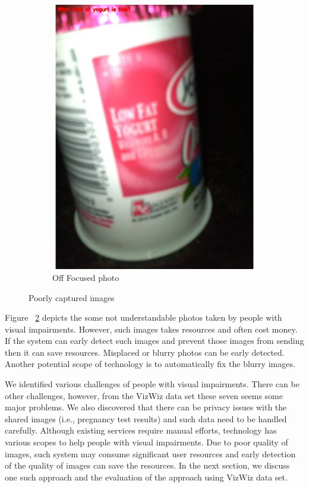 \documentclass[sigconf]{acmart}
\begin{document}
\begin{figure}[hbp]
\begin{subfigure}[b]{0.3\columnwidth}
                \includegraphics[width=\textwidth]{images/off_focus.pdf} 
                 \caption{Off Focused photo}
                 \label{fig:off}
        \end{subfigure}%
        \caption{Poorly captured images} 
        \label{fig:photo}
\end{figure}
Figure ~\ref{fig:photo} depicts the some not understandable photos taken by people with visual impairments. However, such images takes resources and often cost money. If the system can early detect such images and prevent those images from sending then it can save resources. Misplaced or blurry photos can be early detected. Another potential scope of technology is to automatically fix the blurry images. 


We identified various challenges of people with visual impairments. There can be other challenges, however, from the VizWiz data set these seven seems some major problems. We also discovered that there can be privacy issues with the shared images (i.e., pregnancy test results) and such data need to be handled carefully. Although existing services require manual efforts, technology has various scopes to help people with visual impairments. Due to poor quality of images, such system may consume significant user resources and early detection of the quality of images can save the resources. In the next section, we discuss one such approach and the evaluation of the approach using VizWiz data set. 
\end{document}
